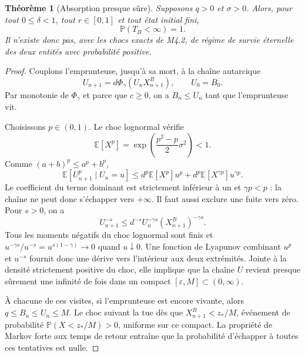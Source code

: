 \documentclass[11pt,a4paper]{article}
\newcommand{\E}{\mathbb E}
\newcommand{\Pp}{\mathbb P}
\newcommand{\1}{\mathbf 1}
\newtheorem{theorem}{Théorème}[section]
\theoremstyle{definition}
\theoremstyle{remark}
\begin{document}
\begin{theorem}[Absorption presque sûre]
Supposons $q>0$ et $\sigma>0$. Alors, pour tout
$0\leq\delta<1$, tout $r\in[0,1]$ et tout état initial fini,
\begin{equation}
\Pp(T_B<\infty)=1.
\label{eq:absorption-as}
\end{equation}
Il n'existe donc pas, avec les chocs exacts de M4.2, de régime de survie
éternelle des deux entités avec probabilité positive.
\end{theorem}
\begin{proof}
Couplons l'emprunteuse, jusqu'à sa mort, à la chaîne autarcique
\begin{equation}
U_{n+1}=d\Phi_\gamma(U_nX^B_{n+1}),\qquad U_0=B_0.
\label{eq:upper-chain}
\end{equation}
Par monotonie de $\Phi_\gamma$ et parce que $c\geq0$, on a
$B_n\leq U_n$ tant que l'emprunteuse vit.

Choisissons $p\in(0,1)$. Le choc lognormal vérifie
\begin{equation}
\E[X^p]=\exp\!\left(\frac{p^2-p}{2}\sigma^2\right)<1.
\label{eq:lognormal-moment}
\end{equation}
Comme $(a+b)^p\leq a^p+b^p$,
\begin{equation}
\E[U_{n+1}^p\mid U_n=u]
\leq d^p\E[X^p]u^p
+d^p\E[X^{\gamma p}]u^{\gamma p}.
\label{eq:drift}
\end{equation}
Le coefficient du terme dominant est strictement inférieur à un et
$\gamma p<p$ : la chaîne ne peut donc s'échapper vers $+\infty$. Il faut
aussi exclure une fuite vers zéro. Pour $s>0$, on a
\[
U_{n+1}^{-s}
\leq d^{-s}U_n^{-\gamma s}(X^B_{n+1})^{-\gamma s}.
\]
Tous les moments négatifs du choc lognormal sont finis et
$u^{-\gamma s}/u^{-s}=u^{s(1-\gamma)}\to0$ quand $u\downarrow0$.
Une fonction de Lyapunov combinant $u^p$ et $u^{-s}$ fournit donc une
dérive vers l'intérieur aux deux extrémités. Jointe à la densité
strictement positive du choc, elle implique que la chaîne $U$ revient
presque sûrement une infinité de fois dans un compact
$[\varepsilon,M]\subset(0,\infty)$.

À chacune de ces visites, si l'emprunteuse est encore vivante, alors
$q\leq B_n\leq U_n\leq M$. Le choc suivant la tue dès que
$X^B_{n+1}<z_*/M$, événement de probabilité
$\Pp(X<z_*/M)>0$, uniforme sur ce compact. La propriété de Markov forte
aux temps de retour entraîne que la probabilité d'échapper à toutes ces
tentatives est nulle.
\end{proof}
\end{document}
